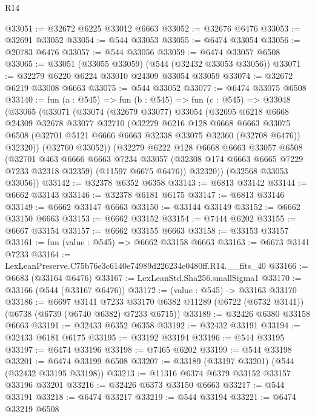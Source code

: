 \begin{lexlean}{R14}
\begin{coremodule}
@33051 := @32672 @6225 @33012 @6663
@33052 := @32676 @6476
@33053 := @32691 @33052
@33054 := @544 @33053
@33055 := @6474 @33054
@33056 := @20783 @6476
@33057 := @544 @33056
@33059 := @6474 @33057 @6508
@33065 := @33051 (@33055 @33059) (@544 (@32432 @33053 @33056))
@33071 := @32279 @6220 @6224 @33010 @24309 @33054 @33059
@33074 := @32672 @6219 @33008 @6663
@33075 := @544 @33052
@33077 := @6474 @33075 @6508
@33140 := fun (a : @545) =>
  fun (b : @545) =>
  fun (c : @545) =>
  @33048
    (@33065
      (@33071
        (@33074
          (@32679 @33077)
          @33054
          (@32695
            @6218
            @6668
            @24309
            @32678
            @33077
            @32710
            (@32279
              @6216
              @128
              @6668
              @6663
              @33075
              @6508
              (@32701 @5121 @6666 @6663 @32338 @33075 @32360 (@32708 @6476))
              @32320))
          (@32760 @33052))
        (@32279
          @6222
          @128
          @6668
          @6663
          @33057
          @6508
          (@32701
            @463
            @6666
            @6663
            @7234
            @33057
            (@32308 @174 @6663 @6665 @7229 @7233 @32318 @32359)
            (@11597 @6675 @6476))
          @32320))
      (@32568 @33053 @33056))
@33142 := @32378 @6352 @6358
@33143 := @6813 @33142
@33144 := @6662 @33143
@33146 := @32378 @6181 @6175
@33147 := @6813 @33146
@33149 := @6662 @33147 @6663
@33150 := @33144 @33149
@33152 := @6662 @33150 @6663
@33153 := @6662 @33152
@33154 := @7444 @6202
@33155 := @6667 @33154
@33157 := @6662 @33155 @6663
@33158 := @33153 @33157
@33161 := fun (value : @545) => @6662 @33158 @6663
@33163 := @6673 @3141 @7233
@33164 := LexLeanPreserve.C75b76e3c6140e74989d226234e0480ff.R14.__fits_40
@33166 := @6683 (@33164 @6476)
@33167 := LexLeanStd.Sha256.smallSigma1
@33170 := @33166 (@544 (@33167 @6476))
@33172 := (value : @545) -> @33163 @33170
@33186 := @6697
    @3141
    @7233
    @33170
    @6382
    @11289
    (@6722 (@6732 @3141))
    (@6738 (@6739 (@6740 @6382) @7233 @6715))
@33189 := @32426 @6380 @33158 @6663
@33191 := @32433 @6352 @6358
@33192 := @32432 @33191
@33194 := @32433 @6181 @6175
@33195 := @33192 @33194
@33196 := @544 @33195
@33197 := @6474 @33196
@33198 := @7465 @6202
@33199 := @544 @33198
@33201 := @6474 @33199 @6508
@33207 := @33189 (@33197 @33201) (@544 (@32432 @33195 @33198))
@33213 := @11316 @6374 @6379 @33152 @33157 @33196 @33201
@33216 := @32426 @6373 @33150 @6663
@33217 := @544 @33191
@33218 := @6474 @33217
@33219 := @544 @33194
@33221 := @6474 @33219 @6508

\end{coremodule}
\end{lexlean}
